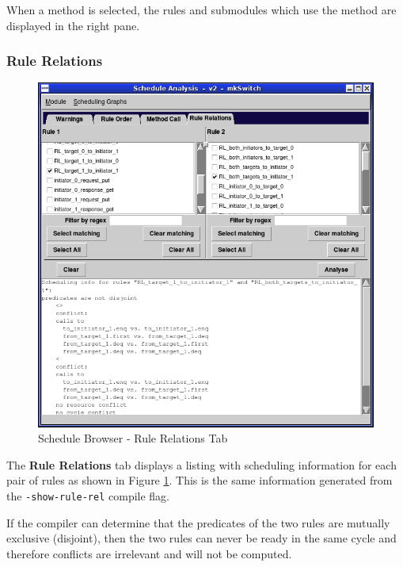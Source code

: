 \documentclass{article}
\newcommand{\te}[1]{\texttt{#1}}
\begin{document}
When a method is selected, the rules and submodules which use the
method are displayed in the right pane.


\subsubsection{Rule Relations}
\begin{figure}[ht]
\begin{center}
\includegraphics[width = 3.5 in]{figures/schedule_rulerel}
\caption{Schedule Browser - Rule Relations Tab}
\label{fig-rulerel}
\end{center}
\end{figure}

The {\bf Rule Relations} tab  displays a listing with scheduling
information for each pair of rules
as shown in Figure \ref{fig-rulerel}. This
is the same information generated from the  \te{-show-rule-rel}
compile flag.

If the compiler can determine that the predicates
of the two rules are mutually exclusive (disjoint), then the two rules
can never be ready in the same cycle and therefore conflicts are
irrelevant and will not be computed.
\end{document}

